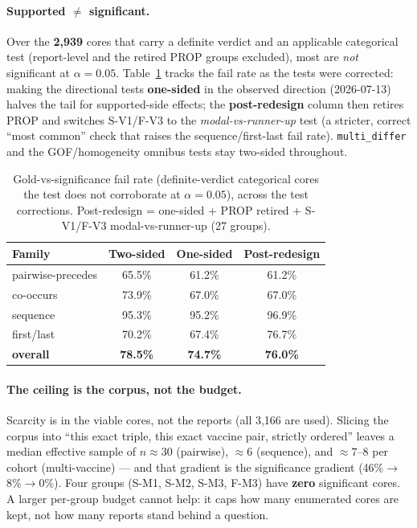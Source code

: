 \documentclass[11pt]{article}
\begin{document}
\paragraph{Supported $\neq$ significant.} Over the \textbf{2{,}939}
cores that carry a definite verdict and an applicable categorical test (report-level and
the retired PROP groups excluded), most are \emph{not} significant at $\alpha=0.05$.
Table~\ref{tab:failrate} tracks the fail rate as the tests were corrected: making the
directional tests \textbf{one-sided} in the observed direction (2026-07-13) halves the
tail for supported-side effects; the \textbf{post-redesign} column then retires PROP and
switches S-V1/F-V3 to the \emph{modal-vs-runner-up} test (a stricter, correct ``most
common'' check that raises the sequence/first-last fail rate). \texttt{multi\_differ} and
the GOF/homogeneity omnibus tests stay two-sided throughout.
\begin{table}[h]
\centering
\caption{Gold-vs-significance fail rate (definite-verdict categorical cores the test does
not corroborate at $\alpha=0.05$), across the test corrections. Post-redesign = one-sided
+ PROP retired + S-V1/F-V3 modal-vs-runner-up (27 groups).}
\label{tab:failrate}
\begin{tabular}{@{}lccc@{}}
\toprule
\textbf{Family} & \textbf{Two-sided} & \textbf{One-sided} & \textbf{Post-redesign} \\
\midrule
pairwise-precedes & 65.5\% & 61.2\% & 61.2\% \\
co-occurs         & 73.9\% & 67.0\% & 67.0\% \\
sequence          & 95.3\% & 95.2\% & 96.9\% \\
first/last        & 70.2\% & 67.4\% & 76.7\% \\
\midrule
\textbf{overall}  & \textbf{78.5\%} & \textbf{74.7\%} & \textbf{76.0\%} \\
\bottomrule
\end{tabular}
\end{table}
\paragraph{The ceiling is the corpus, not the budget.} Scarcity is in
the viable cores, not the reports (all 3{,}166 are used). Slicing the corpus into ``this
exact triple, this exact vaccine pair, strictly ordered'' leaves a median effective
sample of $n\approx30$ (pairwise), $\approx6$ (sequence), and $\approx7$--$8$ per cohort
(multi-vaccine) --- and that gradient is the significance gradient
(46\%$\to$8\%$\to$0\%). Four groups (S-M1, S-M2, S-M3, F-M3) have \textbf{zero}
significant cores. A larger per-group budget cannot help: it caps how many enumerated
cores are kept, not how many reports stand behind a question.
\end{document}
